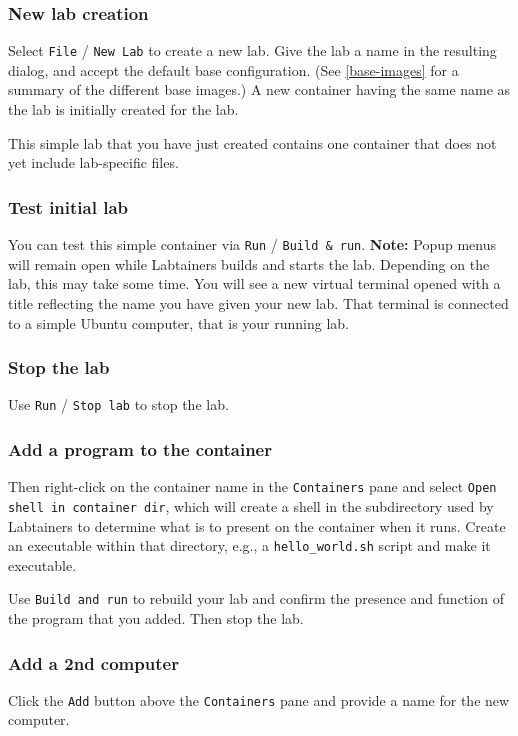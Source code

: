 \documentclass[12pt]{article}
\begin{document}
\subsubsection{New lab creation}
Select {\tt File} / {\tt New Lab}
to create a new lab.  Give the lab a name in the resulting dialog, and accept the default base configuration.  
(See \ref{base-images} for a summary of the different base images.) A new container having the same name
as the lab is initially created for the lab. 

This simple lab that you have just created contains one container that does not yet include lab-specific files.

\subsubsection{Test initial lab}
You can test this simple container via {\tt Run} / {\tt Build \& run}.  \textbf{Note:} Popup menus will remain open
while Labtainers builds and starts the lab.  Depending on the lab, this may take some time.
You will see a new virtual terminal opened with a title reflecting the name you have given your new lab.  That terminal
is connected to a simple Ubuntu computer, that is your running lab.  

\subsubsection{Stop the lab}
Use {\tt Run} / {\tt Stop lab} to stop the lab.  

\subsubsection{Add a program to the container}
Then right-click on the container name in the {\tt Containers} pane
and select {\tt Open shell in container dir}, which will create a shell in the subdirectory used by Labtainers to
determine what is to present on the container when it runs.  Create an executable within that directory, e.g., a
{\tt hello\_world.sh} script and make it executable.

Use {\tt Build and run} to rebuild your lab and confirm the presence and function of the program that you added.
Then stop the lab.

\subsubsection{Add a 2nd computer}
Click the {\tt Add} button above the {\tt Containers} pane and provide a name for the new computer.
\end{document}
